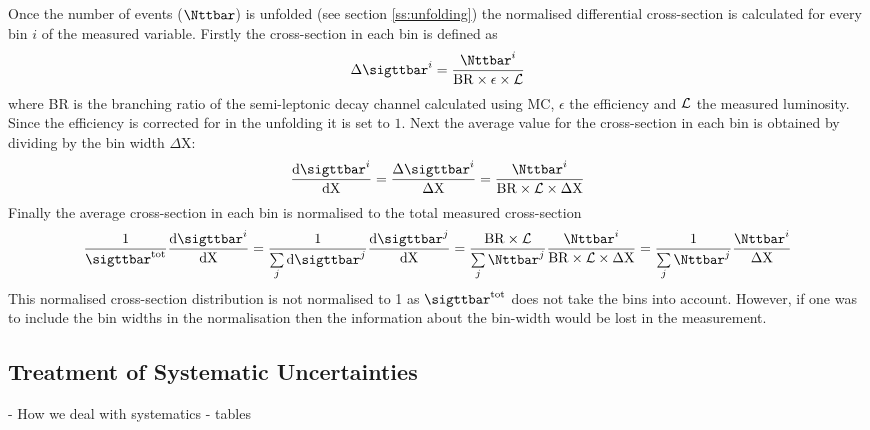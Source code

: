 Once the number of \ttbar events ($\Nttbar$) is unfolded (see section \ref{ss:unfolding}) the normalised
differential cross-section is calculated for every bin $i$ of the measured variable. Firstly the cross-section in each bin is
defined as
\begin{equation}\label{eq:finll_1}
\Delta\sigttbar^i = \frac{\Nttbar^i}{\mathrm{BR} \times \epsilon \times {\cal L}} 
\end{equation}
where BR is the branching ratio of the semi-leptonic decay channel calculated using MC, $\epsilon$ the \ttbar efficiency
and ${\cal L}$ the measured luminosity. Since the efficiency is corrected for in the unfolding it is set to $1$.
Next the average value for the cross-section in each bin is obtained by dividing by the bin width $\Delta \mathrm{X}$:
\begin{equation}
\frac{\mathrm{d}\sigttbar^i}{\mathrm{d} \mathrm{X}} =
\frac{\Delta\sigttbar^i}{\Delta \mathrm{X} } = \frac{\Nttbar^i}{\mathrm{BR} \times {\cal L} \times \Delta \mathrm{X}} 
\end{equation}
Finally the average cross-section in each bin is normalised to the total measured cross-section
\begin{equation}
\label{eq:normalisedxs}
\frac{1}{\sigttbar^\mathrm{tot}} \frac{\mathrm{d}\sigttbar^i}{\mathrm{d} \mathrm{X}} =
\frac{1}{\sum\limits_{j}{\mathrm{d}\sigttbar^j}} \frac{\mathrm{d}\sigttbar^j}{\mathrm{d} \mathrm{X}} =
\frac{\mathrm{BR} \times {\cal L}}{\sum\limits_{j}{\Nttbar^j}}\frac{\Nttbar^i}{\mathrm{BR} \times {\cal L} \times \Delta
\mathrm{X}} = \frac{1}{\sum\limits_{j}{\Nttbar^j}}\frac{\Nttbar^i}{\Delta\mathrm{X}}
\end{equation}
This normalised cross-section distribution is not normalised to 1 as $\sigttbar^\mathrm{tot}$ does not take the bins
into account. However, if one was to include the bin widths in the normalisation then the information about the
bin-width would be lost in the measurement.

\subsection{Treatment of Systematic Uncertainties}
\label{ss:treatment_of_systematic_uncertainties}
		- How we deal with systematics
		- tables
		
